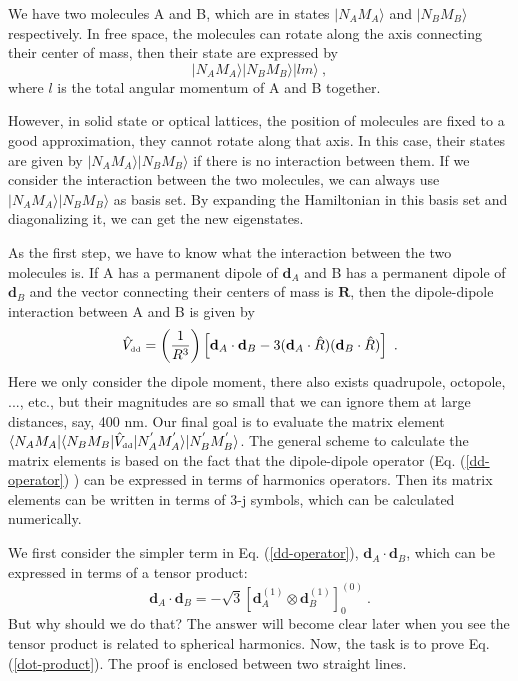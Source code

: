 We have two molecules A and B, which are in states $|N_{A}M_{A}\rangle$ and $|N_{B}M_{B}\rangle$ respectively. In free space, the molecules can rotate along the axis connecting their center of mass, then their state are expressed by
\begin{equation}
|N_{A}M_{A}\rangle |N_{B}M_{B}\rangle |lm\rangle  \ , \nonumber
\end{equation}
where $l$ is the total angular momentum of A and B together. 

However, in solid state or optical lattices, the position of molecules are fixed to a good approximation, they cannot rotate along that axis. In this case, their states are given by $|N_{A}M_{A}\rangle |N_{B}M_{B}\rangle$ if there is no interaction between them. If we consider the interaction between the two molecules, we can always use $|N_{A}M_{A}\rangle |N_{B}M_{B}\rangle$ as basis set. By expanding the Hamiltonian in this basis set and diagonalizing it, we can get the new eigenstates.

As the first step, we have to know what the interaction between the two molecules is. If A has a permanent dipole of $\mathbf{d}_{A}$ and B has a permanent dipole of $\mathbf{d}_{B}$ and the vector connecting their centers of mass is $\mathbf{R}$, then the dipole-dipole interaction between A and B is given by
\begin{equation}
\hat{V}_{\mbox{\tiny dd}} = \left(\frac{1}{R^3}\right)\left[ \mathbf{d}_{A}\cdot\mathbf{d}_{B}-3(\mathbf{d}_{A}\cdot\hat{R})(\mathbf{d}_{B}\cdot\hat{R})\right]  \ . \label{dd-operator}
\end{equation}
Here we only consider the dipole moment, there also exists quadrupole, octopole, ..., etc., but their magnitudes are so small that we can ignore them at large distances, say, 400 nm. Our final goal is to evaluate the matrix element $\langle N_{A}M_{A}|\langle N_{B}M_{B} | \hat{V}_{\mbox{\tiny dd}}|N_{A}^{'}M_{A}^{'}\rangle |N_{B}^{'}M_{B}^{'}      \rangle$. The general scheme to calculate the matrix elements is based on the fact that the dipole-dipole operator (Eq. (\ref{dd-operator}) ) can be expressed in terms of harmonics operators. Then its matrix elements can be written in terms of 3-j symbols, which can be calculated numerically. 

We first consider the simpler term in Eq. (\ref{dd-operator}), $\mathbf{d}_{A}\cdot\mathbf{d}_{B}$, which can be expressed in terms of a tensor product:
\begin{equation}
\mathbf{d}_{A}\cdot\mathbf{d}_{B} = - \sqrt{3} \left[ \mathbf{d}_{A}^{(1)} \otimes \mathbf{d}_{B}^{(1)} \right]_{0}^{(0)} \ . \label{dot-product}
\end{equation}
But why should we do that? The answer will become clear later when you see the tensor product is related to spherical harmonics. Now, the task is to prove Eq. (\ref{dot-product}). The proof is enclosed between two straight lines. 

